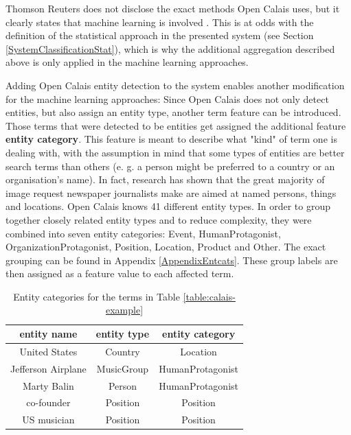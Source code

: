 \documentclass[11pt,a4paper,twoside]{article}
\begin{document}
Thomson Reuters does not disclose the exact methods Open Calais uses, but it clearly states that machine learning is involved \cite{ThomsonReuters2018ThomsonGuide}. This is at odds with the definition of the statistical approach in the presented system (see Section \ref{SystemClassificationStat}), which is why the additional aggregation described above is only applied in the machine learning approaches.

\bigskip

Adding Open Calais entity detection to the system enables another modification for the machine learning approaches: Since Open Calais does not only detect entities, but also assign an entity type, another term feature can be introduced. Those terms that were detected to be entities get assigned the additional feature \textbf{entity category}. This feature is meant to describe what "kind" of term one is dealing with, with the assumption in mind that some types of entities are better search terms than others (e. g. a person might be preferred to a country or an organisation's name). In fact, research has shown that the great majority of image request newspaper journalists make are aimed at named persons, things and locations. \cite[p. 106]{Westman2006ImageContext} Open Calais knows 41 different entity types. In order to group together closely related entity types and to reduce complexity, they were combined into seven entity categories: Event, HumanProtagonist, OrganizationProtagonist, Position, Location, Product and Other. The exact grouping can be found in Appendix \ref{AppendixEntcats}. These group labels are then assigned as a feature value to each affected term.

\begin{table}[b]
    \caption{Entity categories for the terms in Table \ref{table:calais-example}}
    \centering
    \begin{tabular}{|c|c|c|}
        \hline
        \textbf{entity name} & \textbf{entity type} & \textbf{entity category} \\
        \hline
        United States & Country & Location \\
        Jefferson Airplane & MusicGroup & HumanProtagonist \\
        Marty Balin & Person & HumanProtagonist \\
        co-founder & Position & Position \\
        US musician & Position & Position \\
        \hline 
    \end{tabular}
    \label{table:entcat-example}
\end{table}
\end{document}
